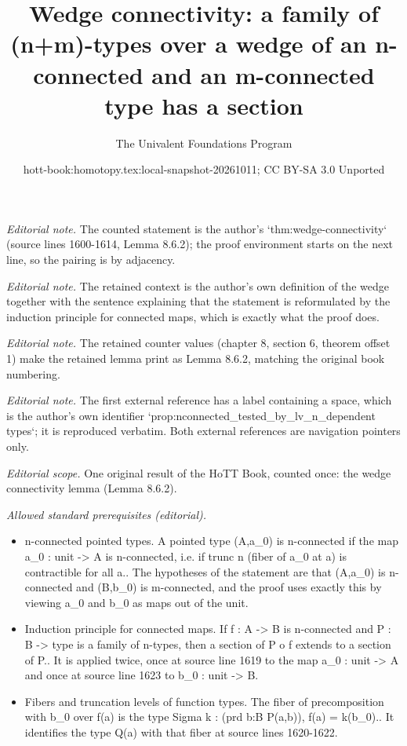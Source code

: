 \documentclass[10pt,a4paper]{article}
\title{Wedge connectivity: a family of (n+m)-types over a wedge of an n-connected and an m-connected type has a section}
\author{The Univalent Foundations Program}
\date{hott-book:homotopy.tex:local-snapshot-20261011; CC BY-SA 3.0 Unported}
\newcounter{chapter}
\theoremstyle{definition}
\theoremstyle{remark}
\numberwithin{equation}{section}
\begin{document}
\maketitle
\setcounter{chapter}{8}
\setcounter{section}{6}
\setcounter{thm}{1}
\setcounter{equation}{0}
\noindent\textit{Editorial note.} The counted statement is the author's `thm:wedge-connectivity` (source lines 1600-1614, Lemma 8.6.2); the proof environment starts on the next line, so the pairing is by adjacency.\par\medskip
\noindent\textit{Editorial note.} The retained context is the author's own definition of the wedge together with the sentence explaining that the statement is reformulated by the induction principle for connected maps, which is exactly what the proof does.\par\medskip
\noindent\textit{Editorial note.} The retained counter values (chapter 8, section 6, theorem offset 1) make the retained lemma print as Lemma 8.6.2, matching the original book numbering.\par\medskip
\noindent\textit{Editorial note.} The first external reference has a label containing a space, which is the author's own identifier `prop:nconnected\_tested\_by\_lv\_n\_dependent types`; it is reproduced verbatim. Both external references are navigation pointers only.\par\medskip
\noindent\textit{Editorial scope.} One original result of the HoTT Book, counted once: the wedge connectivity lemma (Lemma 8.6.2).\par\medskip
\noindent\textit{Allowed standard prerequisites (editorial).}\begin{itemize}
\item n-connected pointed types. A pointed type (A,a\_0) is n-connected if the map a\_0 : unit -> A is n-connected, i.e. if trunc n (fiber of a\_0 at a) is contractible for all a.. The hypotheses of the statement are that (A,a\_0) is n-connected and (B,b\_0) is m-connected, and the proof uses exactly this by viewing a\_0 and b\_0 as maps out of the unit.
\item Induction principle for connected maps. If f : A -> B is n-connected and P : B -> type is a family of n-types, then a section of P o f extends to a section of P.. It is applied twice, once at source line 1619 to the map a\_0 : unit -> A and once at source line 1623 to b\_0 : unit -> B.
\item Fibers and truncation levels of function types. The fiber of precomposition with b\_0 over f(a) is the type Sigma k : (prd b:B P(a,b)), f(a) = k(b\_0).. It identifies the type Q(a) with that fiber at source lines 1620-1622.
\end{itemize}\medskip
\end{document}

